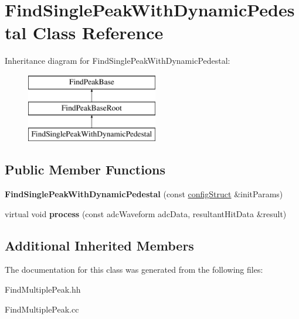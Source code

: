 \hypertarget{class_find_single_peak_with_dynamic_pedestal}{}\section{Find\+Single\+Peak\+With\+Dynamic\+Pedestal Class Reference}
\label{class_find_single_peak_with_dynamic_pedestal}
Inheritance diagram for Find\+Single\+Peak\+With\+Dynamic\+Pedestal\+:\begin{figure}[H]
\begin{center}
\leavevmode
\includegraphics[height=3.000000cm]{class_find_single_peak_with_dynamic_pedestal}
\end{center}
\end{figure}
\subsection*{Public Member Functions}
\begin{DoxyCompactItemize}
\item 
\hypertarget{class_find_single_peak_with_dynamic_pedestal_a620e1d3264f0f939e47130bf239cc04f}{}{\bfseries Find\+Single\+Peak\+With\+Dynamic\+Pedestal} (const \hyperlink{structconfig_struct}{config\+Struct} \&init\+Params)\label{class_find_single_peak_with_dynamic_pedestal_a620e1d3264f0f939e47130bf239cc04f}

\item 
\hypertarget{class_find_single_peak_with_dynamic_pedestal_a4dc2eb2fbdb3463046c26baa90f35833}{}virtual void {\bfseries process} (const adc\+Waveform adc\+Data, resultant\+Hit\+Data \&result)\label{class_find_single_peak_with_dynamic_pedestal_a4dc2eb2fbdb3463046c26baa90f35833}

\end{DoxyCompactItemize}
\subsection*{Additional Inherited Members}


The documentation for this class was generated from the following files\+:\begin{DoxyCompactItemize}
\item 
Find\+Multiple\+Peak.\+hh\item 
Find\+Multiple\+Peak.\+cc\end{DoxyCompactItemize}
